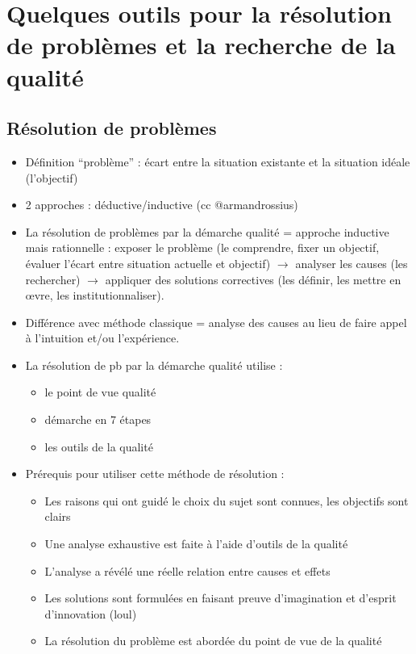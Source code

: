 	\section{Quelques outils pour la résolution de problèmes et la recherche de la qualité}
		\subsection{Résolution de problèmes}
			\begin{itemize}
			\item Définition “problème” : écart entre la situation existante et la situation idéale (l’objectif)
			\item 2 approches : déductive/inductive (cc @armandrossius)
			\item La résolution de problèmes par la démarche qualité = approche inductive mais rationnelle : exposer le problème (le comprendre, fixer un objectif, évaluer l'écart entre situation actuelle et objectif) $\rightarrow$ analyser les causes (les rechercher) $\rightarrow$ appliquer des solutions correctives (les définir, les mettre en \oe{}vre, les institutionnaliser). 
			\item Différence avec méthode classique = analyse des causes au lieu de faire appel à l'intuition et/ou l'expérience. 
			\item La résolution de pb par la démarche qualité utilise : 
				\begin{itemize}
				\item le point de vue qualité
				\item démarche en 7 étapes 
				\item les outils de la qualité
				\end{itemize}
			\item Prérequis pour utiliser cette méthode de résolution : 
				\begin{itemize}
				\item Les raisons qui ont guidé le choix du sujet sont connues, les objectifs sont clairs
				\item Une analyse exhaustive est faite à l'aide d'outils de la qualité
				\item L'analyse a révélé une réelle relation entre causes et effets 
				\item Les solutions sont formulées en faisant preuve d'imagination et d'esprit d'innovation (loul) 
				\item La résolution du problème est abordée du point de vue de la qualité
				\end{itemize}

\end{itemize}
